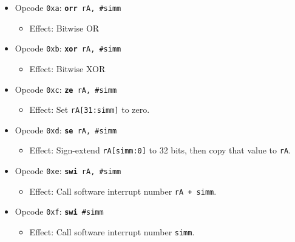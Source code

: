 \documentclass{article}
\begin{document}
\begin{itemize}
\begin{itemize}
		\end{itemize}
	\item Opcode \texttt{0xa}:
		\texttt{\textbf{orr} rA, \#simm}
		\begin{itemize}
		\item Effect: Bitwise OR
		\end{itemize}
	\item Opcode \texttt{0xb}:
		\texttt{\textbf{xor} rA, \#simm}
		\begin{itemize}
		\item Effect: Bitwise XOR
		\end{itemize}
	\item Opcode \texttt{0xc}:
		\texttt{\textbf{ze} rA, \#simm}
		\begin{itemize}
		\item Effect: Set \texttt{rA[31:simm]} to zero.
		\end{itemize}
	\item Opcode \texttt{0xd}:
		\texttt{\textbf{se} rA, \#simm}
		\begin{itemize}
		\item Effect:
			Sign-extend \texttt{rA[simm:0]} to 32 bits, then copy that
			value to \texttt{rA}.
		\end{itemize}
	\item Opcode \texttt{0xe}:
		\texttt{\textbf{swi} rA, \#simm}
		\begin{itemize}
		\item Effect:
			Call software interrupt number \texttt{rA + simm}.
		\end{itemize}
	\item Opcode \texttt{0xf}:
		\texttt{\textbf{swi} \#simm}
		\begin{itemize}
		\item Effect:
			Call software interrupt number \texttt{simm}.
		\end{itemize}
	\end{itemize}
\end{document}
